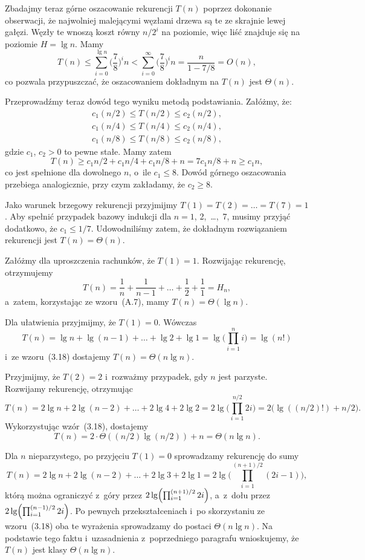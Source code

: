 Zbadajmy teraz górne oszacowanie rekurencji $T(n)$ poprzez dokonanie obserwacji, że najwolniej malejącymi węzłami drzewa są te ze skrajnie lewej gałęzi. Węzły te wnoszą koszt równy $n/2^i$ na  poziomie, więc liść znajduje się na poziomie $H=\lg n$. Mamy
\[
	T(n) \le \sum_{i=0}^{\lg n}\biggl(\frac{7}{8}\biggr)^in < \sum_{i=0}^\infty\biggl(\frac{7}{8}\biggr)^in = \frac{n}{1-7/8} = O(n),
\]
co pozwala przypuszczać, że oszacowaniem dokładnym na $T(n)$ jest $\Theta(n)$.

Przeprowadźmy teraz dowód tego wyniku metodą podstawiania. Załóżmy, że:
\begin{gather*}
	c_1(n/2) \le T(n/2) \le c_2(n/2), \\
	c_1(n/4) \le T(n/4) \le c_2(n/4), \\
	c_1(n/8) \le T(n/8) \le c_2(n/8),
\end{gather*}
gdzie $c_1$, $c_2>0$ to pewne stałe. Mamy zatem
\[
	T(n) \ge c_1n/2+c_1n/4+c_1n/8+n = 7c_1n/8+n \ge c_1n,
\]
co jest spełnione dla dowolnego $n$, o~ile $c_1\le8$. Dowód górnego oszacowania przebiega analogicznie, przy czym zakładamy, że $c_2\ge8$.

Jako warunek brzegowy rekurencji przyjmijmy $T(1)=T(2)=\dots=T(7)=1$. Aby spełnić przypadek bazowy indukcji dla $n=1$, 2,~\dots,~7, musimy przyjąć dodatkowo, że $c_1\le1/7$. Udowodniliśmy zatem, że dokładnym rozwiązaniem rekurencji jest $T(n)=\Theta(n)$.

\subproblem %
Załóżmy dla uproszczenia rachunków, że $T(1)=1$. Rozwijając rekurencję, otrzymujemy
\[
	T(n) = \frac{1}{n}+\frac{1}{n-1}+\dots+\frac{1}{2}+\frac{1}{1} = H_n,
\]
a~zatem, korzystając ze wzoru~(A.7), mamy $T(n)=\Theta(\lg n)$.

\subproblem %
Dla ułatwienia przyjmijmy, że $T(1)=0$. Wówczas
\[
	T(n) = \lg n+\lg(n-1)+\dots+\lg2+\lg1 = \lg\biggl(\prod_{i=1}^ni\biggr) = \lg(n!)
\]
i~ze wzoru~(3.18) dostajemy $T(n)=\Theta(n\lg n)$.

\subproblem %
Przyjmijmy, że $T(2)=2$ i~rozważmy przypadek, gdy $n$ jest parzyste. Rozwijamy rekurencję, otrzymując
\[
	T(n) = 2\lg n+2\lg(n-2)+\dots+2\lg4+2\lg2 = 2\lg\biggl(\prod_{i=1}^{n/2}2i\biggr) = 2\bigl(\lg((n/2)!)+n/2\bigr).
\]
Wykorzystując wzór~(3.18), dostajemy
\[
	T(n) = 2\cdot\Theta((n/2)\lg (n/2))+n = \Theta(n\lg n).
\]

Dla $n$ nieparzystego, po przyjęciu $T(1)=0$ sprowadzamy rekurencję do sumy
\[
	T(n) = 2\lg n+2\lg(n-2)+\dots+2\lg3+2\lg1 = 2\lg\biggl(\prod_{i=1}^{(n+1)/2}(2i-1)\biggr),
\]
którą można ograniczyć z~góry przez $2\lg\Bigl(\prod_{i=1}^{(n+1)/2}2i\Bigr)$, a~z~dołu przez $2\lg\Bigl(\prod_{i=1}^{(n-1)/2}2i\Bigr)$. Po pewnych przekształceniach i~po skorzystaniu ze wzoru~(3.18) oba te wyrażenia sprowadzamy do postaci $\Theta(n\lg n)$. Na podstawie tego faktu i~uzasadnienia z~poprzedniego paragrafu wnioskujemy, że $T(n)$ jest klasy $\Theta(n\lg n)$.

